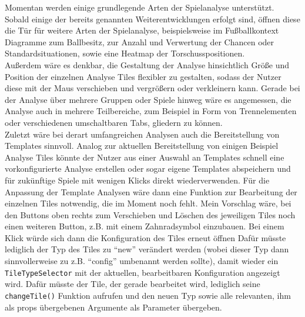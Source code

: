 Momentan werden einige grundlegende Arten der Spielanalyse unterstützt. Sobald einige der bereits genannten Weiterentwicklungen erfolgt sind, öffnen diese die Tür für weitere Arten der Spielanalyse, beispielsweise im Fußballkontext Diagramme zum Ballbesitz, zur Anzahl und Verwertung der Chancen oder Standardsituationen, sowie eine Heatmap der Torschusspositionen.\\
Außerdem wäre es denkbar, die Gestaltung der Analyse hinsichtlich Größe und Position der einzelnen Analyse Tiles flexibler zu gestalten, sodass der Nutzer diese mit der Maus verschieben und vergrößern oder verkleinern kann. Gerade bei der Analyse über mehrere Gruppen oder Spiele hinweg wäre es angemessen, die Analyse auch in mehrere Teilbereiche, zum Beispiel in Form von Trennelementen oder verschiedenen umschaltbaren Tabs, gliedern zu können.\\
Zuletzt wäre bei derart umfangreichen Analysen auch die Bereitstellung von Templates sinnvoll. Analog zur aktuellen Bereitstellung von einigen Beispiel Analyse Tiles könnte der Nutzer aus einer Auswahl an Templates schnell eine vorkonfigurierte Analyse erstellen oder sogar eigene Templates abspeichern und für zukünftige Spiele mit wenigen Klicks direkt wiederverwenden. Für die Anpassung der Template Analysen wäre dann eine Funktion zur Bearbeitung der einzelnen Tiles notwendig, die im Moment noch fehlt. Mein Vorschlag wäre, bei den Buttons oben rechts zum Verschieben und Löschen des jeweiligen Tiles noch einen weiteren Button, z.B. mit einem Zahnradsymbol einzubauen. Bei einem Klick würde sich dann die Konfiguration des Tiles erneut öffnen Dafür müsste lediglich der Typ des Tiles zu ``new'' verändert werden (wobei dieser Typ dann sinnvollerweise zu z.B. ``config'' umbenannt werden sollte), damit wieder ein \texttt{TileTypeSelector} mit der aktuellen, bearbeitbaren Konfiguration angezeigt wird. Dafür müsste der Tile, der gerade bearbeitet wird, lediglich seine \texttt{changeTile()} Funktion aufrufen und den neuen Typ sowie alle relevanten, ihm als props übergebenen Argumente als Parameter übergeben. 
    